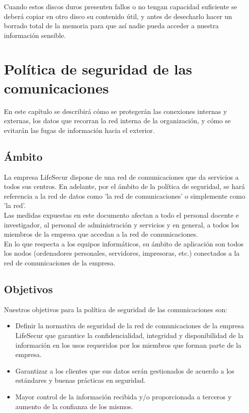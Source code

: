 \documentclass[11pt,bibtotoc,noliststotoc,BCOR0mm]{scrbook}
\begin{document}
Cuando estos discos duros presenten fallos o no tengan capacidad suficiente se deberá copiar en otro disco su contenido útil, y antes de desecharlo hacer un borrado total de la memoria para que así nadie pueda acceder a nuestra información sensible. 



\chapter{Política de seguridad de las comunicaciones}
\label{ch:comunicaciones}

En este capítulo se describirá cómo se protegerán las conexiones
internas y externas, los datos que recorran la red interna de la
organización, y cómo se evitarán las fugas de información hacia el
exterior.

\section{Ámbito}

La empresa LifeSecur dispone de una red de comunicaciones que da servicios a todos sus centros. En adelante, por el ámbito de la política de seguridad, se hará referencia a la red de datos como 'la red de comunicaciones' o simplemente como 'la red'.\\
Las medidas expuestas en este documento afectan a todo el personal docente e investigador, al personal de administración y servicios y en general, a todos los miembros de la empresa que accedan a la red de comunicaciones. \\
En lo que respecta a los equipos informáticos, su ámbito de aplicación son todos los nodos (ordenadores personales, servidores, impresoras, etc.) conectados a la red de comunicaciones de la empresa. \\

\section{Objetivos}
Nuestros objetivos para la política de seguridad de las comunicaciones son:
\begin{itemize}
\item Definir la normativa de seguridad de la red de comunicaciones de la empresa LifeSecur que garantice la confidencialidad, integridad y disponibilidad de la información en los usos requeridos por los miembros que forman parte de la empresa.
\item Garantizar a los clientes que sus datos serán gestionados de acuerdo a los estándares y buenas prácticas en seguridad.
\item Mayor control de la información recibida y/o proporcionada a terceros y aumento de la
confianza de los mismos.
\end{itemize}
\end{document}
